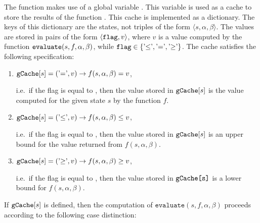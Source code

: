 The function  makes use of a global variable .  This variable is used as a
cache to store the results of the function .  This cache is implemented as a dictionary.  The
keys of this dictionary are the states, not triples of the form $\langle s, \alpha, \beta \rangle$.  The values
are stored in pairs of the form $\langle \texttt{flag}, v \rangle$, where $v$ is a value computed by the
function $\texttt{evaluate}(s, f, \alpha, \beta)$, while $\texttt{flag} \in \{ \mbox{'$\leq$'}, \mbox{'$=$'}, \mbox{'$\geq$'}\}$.
The cache satisfies the following specification:
\begin{enumerate}
\item $\texttt{gCache}[s] = (\mbox{'$=$'}, v) \rightarrow f(s, \alpha, \beta) = v$,

      i.e.~if the flag is equal to \quoted{=}, then the value stored in $\texttt{gCache}[s]$
      is the value computed for the given state $s$ by the function $f$.
\item $\texttt{gCache}[s] = (\mbox{'$\leq$'}, v) \rightarrow f(s, \alpha, \beta) \leq v$,

      i.e.~if the flag is equal to \quoted{\leq}, then the value stored in $\texttt{gCache}[s]$
      is an upper bound for the value returned from $f(s, \alpha, \beta)$.

\item $\texttt{gCache}[s] = (\mbox{'$\geq$'}, v) \rightarrow f(s, \alpha, \beta) \geq v$,

      i.e.~if the flag is equal to \quoted{\geq}, then the value stored in $\texttt{gCache[s]}$
      is a lower bound for $f(s, \alpha, \beta)$.
\end{enumerate}
If $\texttt{gCache}[s]$ is defined, then the computation of $\texttt{evaluate}(s, f, \alpha, \beta)$
proceeds according to the following case distinction:
